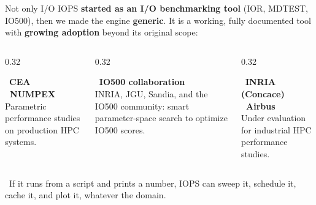 \documentclass[aspectratio=169,11pt]{beamer}
\newcommand{\hl}[1]{{\color{iopsPink}\bfseries #1}}
\begin{document}
\begin{frame}{Not only I/O}
  IOPS \textbf{started as an I/O benchmarking tool} (IOR, MDTEST, IO500), then we
  made the engine \hl{generic}. It is a working, fully documented tool with
  \hl{growing adoption} beyond its original scope:

  \vspace{0.5em}
  \begin{columns}[t]
    \begin{column}{0.32\textwidth}
      \begin{keybox}[equal height group=adopt]
        {\color{iopsBlue}\faServer~\textbf{CEA \textperiodcentered\ NUMPEX}}\\[4pt]
        {\footnotesize Parametric performance studies on production HPC systems.}
      \end{keybox}
    \end{column}
    \begin{column}{0.32\textwidth}
      \begin{keybox}[equal height group=adopt]
        {\color{iopsBlue}\faTrophy~\textbf{IO500 collaboration}}\\[4pt]
        {\footnotesize INRIA, JGU, Sandia, and the IO500 community: smart
        parameter-space search to optimize IO500 scores.}
      \end{keybox}
    \end{column}
    \begin{column}{0.32\textwidth}
      \begin{keybox}[equal height group=adopt]
        {\color{iopsBlue}\faIndustry~\textbf{INRIA (Concace) \textperiodcentered\ Airbus}}\\[4pt]
        {\footnotesize Under evaluation for industrial HPC performance studies.}
      \end{keybox}
    \end{column}
  \end{columns}

  \vspace{0.5em}
  \begin{keybox}[colback=white]
    \faLightbulb~If it runs from a script and prints a number, IOPS can sweep it,
    schedule it, cache it, and plot it, whatever the domain.
  \end{keybox}
\end{frame}
\end{document}
